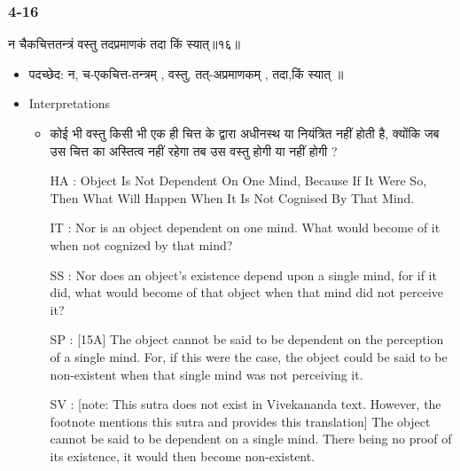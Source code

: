 \begin{frame}[fragile]\frametitle{4-16}
\begin{sanskrit}
न चैकचित्ततन्त्रं वस्तु तदप्रमाणकं तदा किं स्यात्॥१६॥
\end{sanskrit}

	\begin{itemize}
	\item पदच्छेद:  न, च-एकचित्त-तन्त्रम् , वस्तु, तत्-अप्रमाणकम् , तदा,किं‌ ‌स्यात् ॥
	\item Interpretations
		\begin{itemize}	
		\item कोई भी वस्तु किसी भी एक ही चित्त के द्वारा अधीनस्थ या नियंत्रित नहीं होती है, क्योंकि जब उस चित्त का अस्तित्व नहीं रहेगा तब उस वस्तु होगी या नहीं होगी ?
		\item [HA]: Object Is Not Dependent On One Mind, Because If It Were So, Then What Will Happen When It Is Not Cognised By That Mind.
		\item [IT]: Nor is an object dependent on one mind. What would become of it when not cognized by that mind?
		\item [SS]: Nor does an object’s existence depend upon a single mind, for if it did, what would become of that object when that mind did not perceive it?
		\item [SP]: [15A] The object cannot be said to be dependent on the perception of a single mind. For, if this were the case, the object could be said to be non-existent when that single mind was not perceiving it.
		\item [SV]: [note: This sutra does not exist in Vivekananda text. However, the footnote mentions this sutra and provides this translation] The object cannot be said to be dependent on a single mind. There being no proof of its existence, it would then become non-existent. 
		\end{itemize}
	\end{itemize}
\end{frame}


